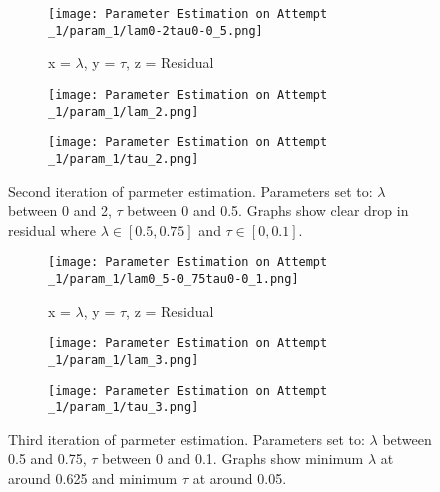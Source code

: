     \begin{figure}
        \begin{subfigure}{.8\textwidth}
        \centering
        \texttt{[image: Parameter Estimation on Attempt \_1/param\_1/lam0-2tau0-0\_5.png]}
        \caption{x = $\lambda$, y = $\tau$, z = Residual}
        \label{pe2:1}
        \end{subfigure}

        \begin{subfigure}{.45\textwidth}
        \centering
        \texttt{[image: Parameter Estimation on Attempt \_1/param\_1/lam\_2.png]}
        \caption{}
        \label{pe2:2}
        \end{subfigure}
        \begin{subfigure}{.45\textwidth}
        \centering
        \texttt{[image: Parameter Estimation on Attempt \_1/param\_1/tau\_2.png]}
        \caption{}
        \label{pe2:3}
        \end{subfigure}
        \caption{Second iteration of parmeter estimation. Parameters set to: $\lambda$ between 0 and 2, $\tau$ between 0 and 0.5. Graphs show clear drop in residual where $\lambda \in [0.5,0.75]$ and $\tau \in [0,0.1]$.}
        \label{pe2}
    \end{figure}

    \begin{figure}
        \begin{subfigure}{.8\textwidth}
        \centering
        \texttt{[image: Parameter Estimation on Attempt \_1/param\_1/lam0\_5-0\_75tau0-0\_1.png]}
        \caption{x = $\lambda$, y = $\tau$, z = Residual}
        \label{pe3:1}
        \end{subfigure}

        \begin{subfigure}{.45\textwidth}
        \centering
        \texttt{[image: Parameter Estimation on Attempt \_1/param\_1/lam\_3.png]}
        \caption{}
        \label{pe3:2}
        \end{subfigure}
        \begin{subfigure}{.45\textwidth}
        \centering
        \texttt{[image: Parameter Estimation on Attempt \_1/param\_1/tau\_3.png]}
        \caption{}
        \label{pe3:3}
        \end{subfigure}
        \caption{Third iteration of parmeter estimation. Parameters set to: $\lambda$ between 0.5 and 0.75, $\tau$ between 0 and 0.1. Graphs show minimum $\lambda$ at around 0.625 and minimum $\tau$ at around 0.05.}
        \label{pe3}
    \end{figure}

